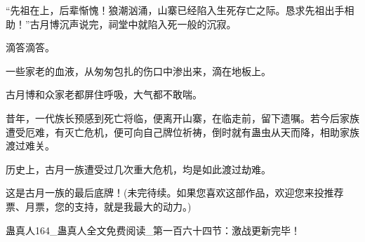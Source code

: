 \begin{this_body}
“先祖在上，后辈惭愧！狼潮汹涌，山寨已经陷入生死存亡之际。恳求先祖出手相助！”古月博沉声说完，祠堂中就陷入死一般的沉寂。

滴答滴答。

一些家老的血液，从匆匆包扎的伤口中渗出来，滴在地板上。

古月博和众家老都屏住呼吸，大气都不敢喘。

昔年，一代族长预感到死亡将临，便离开山寨，在临走前，留下遗嘱。若今后家族遭受厄难，有灭亡危机，便可向自己牌位祈祷，倒时就有蛊虫从天而降，相助家族渡过难关。

历史上，古月一族遭受过几次重大危机，均是如此渡过劫难。

这是古月一族的最后底牌！(未完待续。如果您喜欢这部作品，欢迎您来投推荐票、月票，您的支持，就是我最大的动力。)

蛊真人164\_蛊真人全文免费阅读\_第一百六十四节：激战更新完毕！

\end{this_body}

